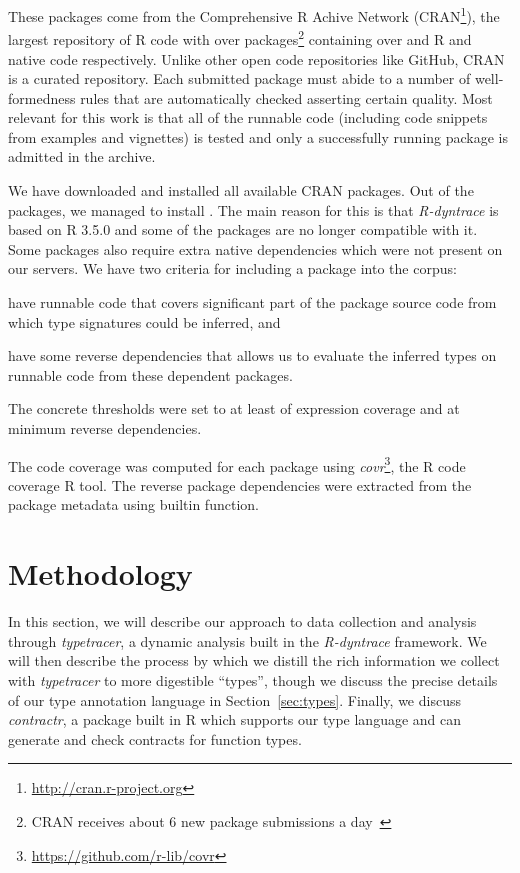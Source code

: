\documentclass[acmsmall,review,anonymous]{acmart}\settopmatter{printfolios=true,printccs=false,printacmref=false}
\newcommand{\contractr}{\emph{contractr}\xspace} %
\newcommand{\typetracer}{\emph{typetracer}\xspace} %
\newcommand{\rdt}{\emph{R-dyntrace}\xspace}
\newcommand{\covr}{\emph{covr}\xspace}
\begin{document}
These packages come from the Comprehensive R Achive Network
(CRAN\footnote{\url{http://cran.r-project.org}}), the largest repository of
R code with over \AllCranRnd packages\footnote{CRAN receives about 6 new
  package submissions a day~\cite{Ligges2017}} containing over \AllRCodeRnd
and \AllNativeCodeRnd R and native code respectively. Unlike other open code
repositories like GitHub, CRAN is a curated repository. Each submitted
package must abide to a number of well-formedness rules that are
automatically checked asserting certain quality. Most relevant for this work
is that all of the runnable code (including code snippets from examples and
vignettes) is tested and only a successfully running package is admitted in
the archive.

We have downloaded and installed all available CRAN packages. Out of the
\AllCranRnd packages, we managed to install \AllLoadableRnd. The main reason
for this is that \rdt is based on R 3.5.0 and some of the packages are no
longer compatible with it. Some packages also require extra native
dependencies which were not present on our servers.  We have two criteria
for including a package into the corpus:
\begin{inparaenum}[(1)]
\item have runnable code that covers significant part of the package source
  code from which type signatures could be inferred, and
\item have some reverse dependencies that allows us to evaluate the inferred
  types on runnable code from these dependent packages.
\end{inparaenum}
The concrete thresholds were set to at least \ThresholdCodeCoverage of
expression coverage and at minimum \ThresholdRevdeps reverse dependencies.

The code coverage was computed for each package using
\covr\footnote{\url{https://github.com/r-lib/covr}}, the R code coverage R
tool.  The reverse package dependencies were extracted from the package
metadata using builtin function.

%
%
%
\section{Methodology}

In this section, we will describe our approach to data collection and
analysis through \typetracer, a dynamic analysis built in the \rdt
framework.  We will then describe the process by which we distill the rich
information we collect with \typetracer to more digestible ``types'', though
we discuss the precise details of our type annotation language in
Section~\ref{sec:types}.  Finally, we discuss \contractr, a package built in
R which supports our type language and can generate and check contracts for
function types.
\end{document}
